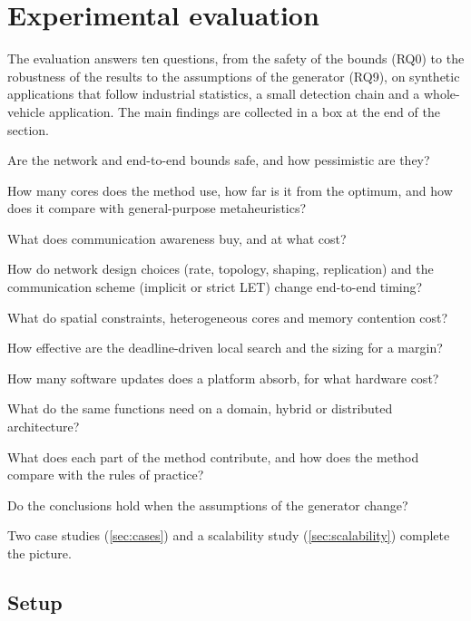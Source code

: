 \section{Experimental evaluation}
\label{sec:evaluation}

\begin{inbrief}
The evaluation answers ten questions, from the safety of the bounds
(RQ0) to the robustness of the results to the assumptions of the
generator (RQ9), on synthetic applications that follow industrial
statistics, a small detection chain and a whole-vehicle application.
The main findings are collected in a box at the end of the section.
\end{inbrief}

\begin{description}[font=\sffamily\bfseries\color{brand},style=unboxed,leftmargin=0pt]
\item[RQ0] Are the network and end-to-end bounds safe, and how
pessimistic are they?
\item[RQ1] How many cores does the method use, how far is it from the
optimum, and how does it compare with general-purpose metaheuristics?
\item[RQ2] What does communication awareness buy, and at what cost?
\item[RQ3] How do network design choices (rate, topology, shaping,
replication) and the communication scheme (implicit or strict LET) change
end-to-end timing?
\item[RQ4] What do spatial constraints, heterogeneous cores and memory
contention cost?
\item[RQ5] How effective are the deadline-driven local search and the
sizing for a margin?
\item[RQ6] How many software updates does a platform absorb, for what
hardware cost?
\item[RQ7] What do the same functions need on a domain, hybrid or
distributed architecture?
\item[RQ8] What does each part of the method contribute, and how does the
method compare with the rules of practice?
\item[RQ9] Do the conclusions hold when the assumptions of the generator
change?
\end{description}
Two case studies (\cref{sec:cases}) and a scalability study
(\cref{sec:scalability}) complete the picture.

\subsection{Setup}
\label{sec:setup}

